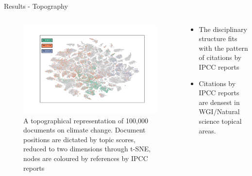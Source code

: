 \documentclass[9pt]{beamer}
\begin{document}
\begin{frame}{Results - Topography}

\begin{columns}
	\begin{column}{0.7\linewidth}
		\begin{figure}	
			\includegraphics[width=\linewidth]{../tsne_results/plots/run_662_s_100000_p30_wgs}
			\caption{A topographical representation of 100,000 documents on climate change. Document positions are dictated by topic scores, reduced to two dimensions through t-SNE, nodes are coloured by references by IPCC reports}
		\end{figure}
	\end{column}
	\begin{column}{0.3\linewidth}	
		\begin{center}
			\begin{itemize}
				\item<1-> The disciplinary structure fits with the pattern of citations by IPCC reports
				\item<2-> Citations by IPCC reports are densest in WGI/Natural science topical areas.
			\end{itemize}
		\end{center}
	\end{column}
\end{columns}

\end{frame}
\end{document}
